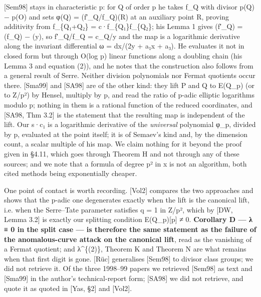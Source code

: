 \documentclass[11pt,a4paper]{article}
\theoremstyle{named}
\begin{document}
[Sem98] stays in characteristic p: for Q of order p he takes f\_Q with divisor p(Q) − p(O) and sets φ(Q) = (f′\_Q/f\_Q)(R) at an auxiliary point R, proving additivity from f\_\{Q₁+Q₂\} = c·f\_\{Q₁\}f\_\{Q₂\}; his Lemma 1 gives (f′\_Q) = (f\_Q) − (y), so f′\_Q/f\_Q = c\_Q/y and the map is a logarithmic derivative along the invariant differential ω = dx/(2y + a₁x + a₃). He evaluates it not in closed form but through O(log p) linear functions along a doubling chain (his Lemma 3 and equation (2)), and he notes that the construction also follows from a general result of Serre. Neither division polynomials nor Fermat quotients occur there. [Sma99] and [SA98] are of the other kind: they lift P and Q to E(Q\_p) (or to Z/p²) by Hensel, multiply by p, and read the ratio of p-adic elliptic logarithms modulo p; nothing in them is a rational function of the reduced coordinates, and [SA98, Thm 3.2] is the statement that the resulting map is independent of the lift. Our s·c₁ is a logarithmic derivative of the \textit{universal} polynomial φ\_p, divided by p, evaluated at the point itself; it is of Semaev's kind and, by the dimension count, a scalar multiple of his map. We claim nothing for it beyond the proof given in §4.11, which goes through Theorem H and not through any of these sources; and we note that a formula of degree p² in x is not an algorithm, both cited methods being exponentially cheaper.

One point of contact is worth recording. [Vol2] compares the two approaches and shows that the p-adic one degenerates exactly when the lift is the canonical lift, i.e. when the Serre–Tate parameter satisfies q = 1 in Z/p², which by [DW, Lemma 3.2] is exactly our splitting condition E(Q\_p)[p] ≠ 0. \textbf{Corollary D — λ ≡ 0 in the split case — is therefore the same statement as the failure of the anomalous-curve attack on the canonical lift}, read as the vanishing of a Fermat quotient; and λ\textasciicircum{}\{(2)\}, Theorem K and Theorem N are what remains when that first digit is gone. [Rüc] generalises [Sem98] to divisor class groups; we did not retrieve it. Of the three 1998–99 papers we retrieved [Sem98] as text and [Sma99] in the author's technical-report form; [SA98] we did not retrieve, and quote it as quoted in [Yas, §2] and [Vol2].
\end{document}
